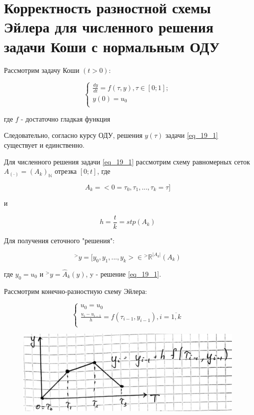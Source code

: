 \documentclass[__main__.tex]{subfiles}
\begin{document}
\section{Корректность разностной схемы Эйлера для численного решения задачи Коши с нормальным ОДУ}

Рассмотрим задачу Коши $(t > 0)$:

\begin{equation}
\label{eq_19_1}
\begin{cases}
\frac{dy}{dt} = f(\tau, y), \tau \in [0;1];\\
y(0) = u_0\\
\end{cases}
\end{equation}

где $f$ - достаточно гладкая функция 

Следовательно, согласно курсу ОДУ, решения $y(\tau)$ задачи \ref{eq_19_1} существует и единственно. 

Для численного решения задачи \ref{eq_19_1} рассмотрим схему равномерных сеток $A_{(\cdot)} = (A_k)_{\mathbb{N}}$ отрезка $[0; t]$, где  

$$A_k = <0 = \tau_0, \tau_1, ..., \tau_k = \tau]$$

и 

$$h = \frac{t}{k} = stp(A_k)$$

Для получения сеточного "решения":

$${}^{>}y = [y_0, y_1, ..., y_k> \in {}^{>}\mathbb{R}^{|A_k|}(A_k)$$

где $y_0 = u_0$ и ${}^{>}y = \hat{A}_k(y)$, y - решение \ref{eq_19_1}.

Рассмотрим конечно-разностную схему Эйлера:

\begin{equation}
\label{eq_19_3}
\begin{cases}
u_0 = u_0\\
\frac{u_i - u_{i - 1}}{h} = f(\tau_{i - 1} , y_{i - 1}), i = \overline{1, k}\\
\end{cases}
\end{equation}

\begin{figure}[h!]
	\centering
	\includegraphics[width=0.5\linewidth]{img/img_19.1}
	\label{img_19.1}
\end{figure}
\end{document}
